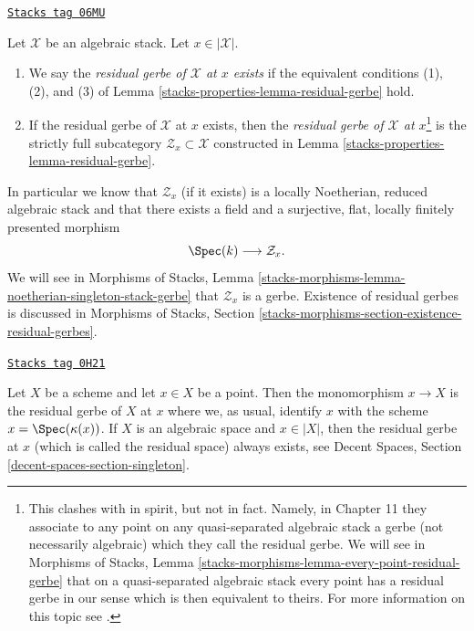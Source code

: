 \begin{definition}
\label{stacks-properties-definition-residual-gerbe}
\href{https://stacks.math.columbia.edu/tag/06MU}{\texttt{Stacks tag 06MU}}

Let $\mathcal{X}$ be an algebraic stack. Let $x \in |\mathcal{X}|$.
\begin{enumerate}
\item We say the {\it residual gerbe of $\mathcal{X}$ at $x$ exists}
if the equivalent conditions (1), (2), and (3) of
Lemma \ref{stacks-properties-lemma-residual-gerbe}
hold.
\item If the residual gerbe of $\mathcal{X}$ at $x$ exists, then the
{\it residual gerbe of $\mathcal{X}$ at $x$}\footnote{This clashes with
\cite{LM-B} in spirit, but not in fact. Namely, in Chapter 11 they associate
to any point on any quasi-separated algebraic stack a gerbe (not necessarily
algebraic) which they call the residual gerbe. We will see in
Morphisms of Stacks, Lemma
\ref{stacks-morphisms-lemma-every-point-residual-gerbe}
that on a quasi-separated algebraic stack every point
has a residual gerbe in our sense which is then equivalent to theirs. For
more information on this topic see
\cite[Appendix B]{rydh_etale_devissage}.}
is the strictly full
subcategory $\mathcal{Z}_x \subset \mathcal{X}$ constructed in
Lemma \ref{stacks-properties-lemma-residual-gerbe}.
\end{enumerate}
\end{definition}

In particular we know that $\mathcal{Z}_x$ (if it exists) is a
locally Noetherian, reduced algebraic stack and that there exists a
field and a surjective, flat, locally finitely presented morphism
$$
\Spec(k) \longrightarrow \mathcal{Z}_x.
$$
We will see in
Morphisms of Stacks, Lemma
\ref{stacks-morphisms-lemma-noetherian-singleton-stack-gerbe}
that $\mathcal{Z}_x$ is a gerbe. Existence of residual gerbes is
discussed in Morphisms of Stacks, Section
\ref{stacks-morphisms-section-existence-residual-gerbes}.

\begin{example}
\label{stacks-properties-example-residual-gerbe}
\href{https://stacks.math.columbia.edu/tag/0H21}{\texttt{Stacks tag 0H21}}

Let $X$ be a scheme and let $x \in X$ be a point. Then the monomorphism
$x \to X$ is the residual gerbe of $X$ at $x$ where we, as usual, identify
$x$ with the scheme $x = \Spec(\kappa(x))$. If $X$ is an algebraic space
and $x \in |X|$, then the residual gerbe at $x$ (which is called
the residual space) always exists, see
Decent Spaces, Section \ref{decent-spaces-section-singleton}.
\end{example}

